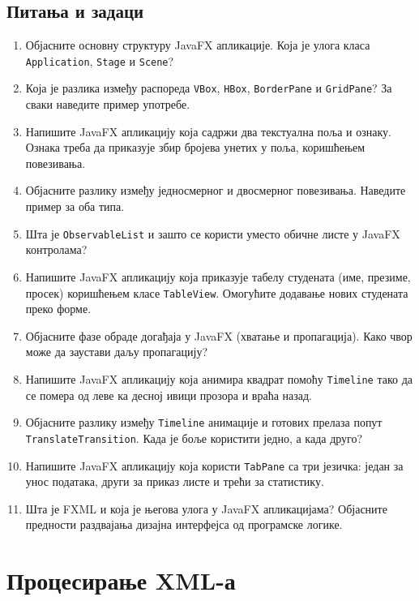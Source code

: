 \section{Питања и задаци}

\begin{enumerate}
\item Објасните основну структуру JavaFX апликације. Која је улога класа \texttt{Application}, \texttt{Stage} и \texttt{Scene}?
\item Која је разлика између распореда \texttt{VBox}, \texttt{HBox}, \texttt{BorderPane} и \texttt{GridPane}? За сваки наведите пример употребе.
\item Напишите JavaFX апликацију која садржи два текстуална поља и ознаку. Ознака треба да приказује збир бројева унетих у поља, коришћењем повезивања.
\item Објасните разлику између једносмерног и двосмерног повезивања. Наведите пример за оба типа.
\item Шта је \texttt{ObservableList} и зашто се користи уместо обичне листе у JavaFX контролама?
\item Напишите JavaFX апликацију која приказује табелу студената (име, презиме, просек) коришћењем класе \texttt{TableView}. Омогућите додавање нових студената преко форме.
\item Објасните фазе обраде догађаја у JavaFX (хватање и пропагација). Како чвор може да заустави даљу пропагацију?
\item Напишите JavaFX апликацију која анимира квадрат помоћу \texttt{Timeline} тако да се помера од леве ка десној ивици прозора и враћа назад.
\item Објасните разлику између \texttt{Timeline} анимације и готових прелаза попут \texttt{TranslateTransition}. Када је боље користити једно, а када друго?
\item Напишите JavaFX апликацију која користи \texttt{TabPane} са три језичка: један за унос података, други за приказ листе и трећи за статистику.
\item Шта је FXML и која је његова улога у JavaFX апликацијама? Објасните предности раздвајања дизајна интерфејса од програмске логике.
\end{enumerate}


\setlength{\parindent}{15pt}
\setlength{\parskip}{0pt}
\chapter{Процесирање XML-а}


